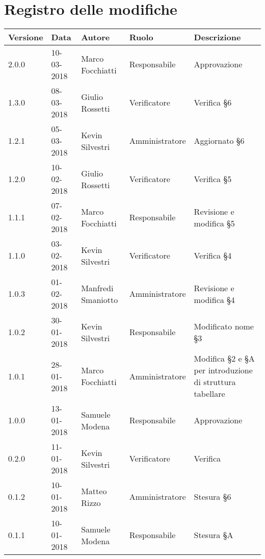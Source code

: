 \documentclass[./PianodiProgetto.tex]{subfiles}
\begin{document}
\chapter*{Registro delle modifiche}
\setlength\LTleft{-22mm}
\begin{longtable}{|p{20mm}|p{20mm}|p{40mm}|p{30mm}|p{50mm}|}
	\hline
	\textbf{Versione} & \textbf{Data} & \textbf{Autore} & \textbf{Ruolo} & \textbf{Descrizione} \\ 
		\hline 2.0.0 & 10-03-2018 & Marco Focchiatti & Responsabile & Approvazione \\
		
		\hline 1.3.0 & 08-03-2018 & Giulio Rossetti & Verificatore & Verifica §6 \\
		
		\hline 1.2.1 & 05-03-2018 & Kevin Silvestri & Amministratore & Aggiornato §6 \\
		
		\hline 1.2.0 & 10-02-2018 & Giulio Rossetti & Verificatore & Verifica §5 \\
		
		\hline 1.1.1 & 07-02-2018 & Marco Focchiatti & Responsabile & Revisione e modifica §5 \\
		
		\hline 1.1.0 & 03-02-2018 & Kevin Silvestri & Verificatore & Verifica §4 \\
				
		\hline 1.0.3 & 01-02-2018 & Manfredi Smaniotto & Amministratore & Revisione e modifica §4 \\
		
		\hline 1.0.2 & 30-01-2018 & Kevin Silvestri & Responsabile & Modificato nome §3 \\
		
		\hline 1.0.1 & 28-01-2018 & Marco Focchiatti & Amministratore & Modifica §2 e §A per introduzione di struttura tabellare \\
	
		\hline 1.0.0 & 13-01-2018 & Samuele Modena & Responsabile & Approvazione \\
 
		\hline 0.2.0 & 11-01-2018 & Kevin Silvestri & Verificatore & Verifica \\
 
		\hline 0.1.2 & 10-01-2018 & Matteo Rizzo & Amministratore & Stesura §6 \\
 
		\hline 0.1.1 & 10-01-2018 & Samuele Modena & Responsabile & Stesura §A \\
 

\end{longtable}
\end{document}
